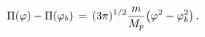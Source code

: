 \begin{equation} \label{traject}
\Pi(\varphi) - \Pi(\varphi_b) \, = \,
(3 \pi)^{1/2} {m \over {M_p}} \bigl( \varphi^2 - \varphi_b^2 \bigr) \, .
\end{equation}

